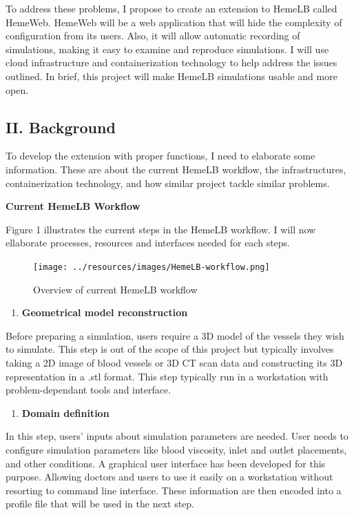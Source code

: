 \documentclass[]{article}
\providecommand{\tightlist}{%
  \setlength{\itemsep}{0pt}\setlength{\parskip}{0pt}}
\begin{document}
To address these problems, I propose to create an extension to HemeLB
called HemeWeb. HemeWeb will be a web application that will hide the
complexity of configuration from its users. Also, it will allow
automatic recording of simulations, making it easy to examine and
reproduce simulations. I will use cloud infrastructure and
containerization technology to help address the issues outlined. In
brief, this project will make HemeLB simulations usable and more open.

\subsection{II. Background}\label{ii.-background}

To develop the extension with proper functions, I need to elaborate some
information. These are about the current HemeLB workflow, the
infrastructures, containerization technology, and how similar project
tackle similar problems.

\textbf{Current HemeLB Workflow}

Figure 1 illustrates the current steps in the HemeLB workflow. I will
now ellaborate processes, resources and interfaces needed for each
steps.

\begin{figure}[H]
\centering
\texttt{[image: ../resources/images/HemeLB-workflow.png]}
\caption{Overview of current HemeLB workflow}
\end{figure}

\begin{enumerate}
\def\labelenumi{\arabic{enumi}.}
\tightlist
\item
  \textbf{Geometrical model reconstruction}
\end{enumerate}

Before preparing a simulation, users require a 3D model of the vessels
they wish to simulate. This step is out of the scope of this project but
typically involves taking a 2D image of blood vessels or 3D CT scan data
and constructing its 3D representation in a .stl format. This step
typically run in a workstation with problem-dependant tools and
interface.

\begin{enumerate}
\def\labelenumi{\arabic{enumi}.}
\setcounter{enumi}{1}
\tightlist
\item
  \textbf{Domain definition}
\end{enumerate}

In this step, users' inputs about simulation parameters are needed. User
needs to configure simulation parameters like blood viscosity, inlet and
outlet placements, and other conditions. A graphical user interface has
been developed for this purpose. Allowing doctors and users to use it
easily on a workstation without resorting to command line interface.
These information are then encoded into a profile file that will be used
in the next step.
\end{document}
